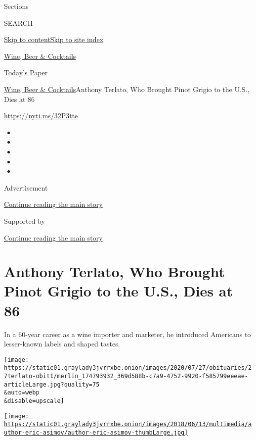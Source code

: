 Sections

SEARCH

\protect\hyperlink{site-content}{Skip to
content}\protect\hyperlink{site-index}{Skip to site index}

\href{https://www.nytimes3xbfgragh.onion/section/food/drinks}{Wine, Beer
\& Cocktails}

\href{https://myaccount.nytimes3xbfgragh.onion/auth/login?response_type=cookie\&client_id=vi}{}

\href{https://www.nytimes3xbfgragh.onion/section/todayspaper}{Today's
Paper}

\href{/section/food/drinks}{Wine, Beer \& Cocktails}\textbar{}Anthony
Terlato, Who Brought Pinot Grigio to the U.S., Dies at 86

\url{https://nyti.ms/32P3tte}

\begin{itemize}
\item
\item
\item
\item
\item
\end{itemize}

Advertisement

\protect\hyperlink{after-top}{Continue reading the main story}

Supported by

\protect\hyperlink{after-sponsor}{Continue reading the main story}

\hypertarget{anthony-terlato-who-brought-pinot-grigio-to-the-us-dies-at-86}{%
\section{Anthony Terlato, Who Brought Pinot Grigio to the U.S., Dies at
86}\label{anthony-terlato-who-brought-pinot-grigio-to-the-us-dies-at-86}}

In a 60-year career as a wine importer and marketer, he introduced
Americans to lesser-known labels and shaped tastes.

\texttt{[image: https://static01.graylady3jvrrxbe.onion/images/2020/07/27/obituaries/27terlato-obit1/merlin\_174793932\_369d588b-c7a9-4752-9920-f585799eeeae-articleLarge.jpg?quality=75\\\&auto=webp\\\&disable=upscale]}

\href{https://www.nytimes3xbfgragh.onion/by/eric-asimov}{\texttt{[image: https://static01.graylady3jvrrxbe.onion/images/2018/06/13/multimedia/author-eric-asimov/author-eric-asimov-thumbLarge.jpg]}}

